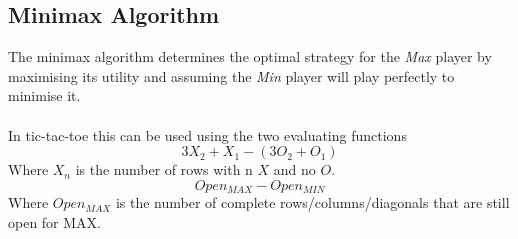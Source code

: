 \subsection{Minimax Algorithm}
The minimax algorithm determines the optimal strategy for the \emph{Max} player by maximising its utility and assuming the  \emph{Min} player will play perfectly to minimise it.
\\\\
In tic-tac-toe this can be used using the two evaluating functions 
\begin{equation}
    3X_2 + X_1 - (3O_2+O_1)
\end{equation}
Where $X_n$ is the number of rows with n $X$ and no $O$.
\begin{equation}
    Open_{MAX} - Open_{MIN}
\end{equation}
Where $Open_{MAX}$ is the number of complete rows/columns/diagonals that are still open for MAX.
